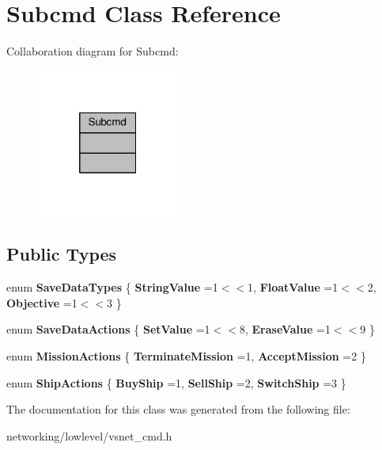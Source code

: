 \hypertarget{classSubcmd}{}\section{Subcmd Class Reference}
\label{classSubcmd}


Collaboration diagram for Subcmd\+:
\nopagebreak
\begin{figure}[H]
\begin{center}
\leavevmode
\includegraphics[width=133pt]{d6/dea/classSubcmd__coll__graph}
\end{center}
\end{figure}
\subsection*{Public Types}
\begin{DoxyCompactItemize}
\item 
enum {\bfseries Save\+Data\+Types} \{ {\bfseries String\+Value} =1$<$$<$1, 
{\bfseries Float\+Value} =1$<$$<$2, 
{\bfseries Objective} =1$<$$<$3
 \}\hypertarget{classSubcmd_a3c3a85e3089a4db18858684152be99be}{}\label{classSubcmd_a3c3a85e3089a4db18858684152be99be}

\item 
enum {\bfseries Save\+Data\+Actions} \{ {\bfseries Set\+Value} =1$<$$<$8, 
{\bfseries Erase\+Value} =1$<$$<$9
 \}\hypertarget{classSubcmd_aadd723ac4694e2a114ac85d0e7209cc8}{}\label{classSubcmd_aadd723ac4694e2a114ac85d0e7209cc8}

\item 
enum {\bfseries Mission\+Actions} \{ {\bfseries Terminate\+Mission} =1, 
{\bfseries Accept\+Mission} =2
 \}\hypertarget{classSubcmd_afb917aaaa8d43b888f30ccc418c8391c}{}\label{classSubcmd_afb917aaaa8d43b888f30ccc418c8391c}

\item 
enum {\bfseries Ship\+Actions} \{ {\bfseries Buy\+Ship} =1, 
{\bfseries Sell\+Ship} =2, 
{\bfseries Switch\+Ship} =3
 \}\hypertarget{classSubcmd_ae63f3ec85290f2e8a76ffe0843d0e874}{}\label{classSubcmd_ae63f3ec85290f2e8a76ffe0843d0e874}

\end{DoxyCompactItemize}


The documentation for this class was generated from the following file\+:\begin{DoxyCompactItemize}
\item 
networking/lowlevel/vsnet\+\_\+cmd.\+h\end{DoxyCompactItemize}
